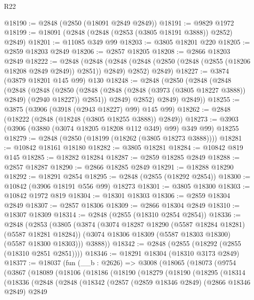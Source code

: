 \begin{lexlean}{R22}
\begin{coremodule}
@18190 := @2848 (@2850 (@18091 @2849 @2849))
@18191 := @9829 @1972
@18199 := @18091 (@2848 (@2848 (@2853 (@3805 @18191 @3888)) @2852) @2849)
@18201 := @11085 @349 @99
@18203 := @3805 @18201 @220
@18205 := @2859 @18203 @2849
@18206 := @2857 @18205
@18208 := @2866 @18203 @2849
@18222 := @2848
    (@2848
      (@2848 (@2848 (@2850 (@2848 (@2855 (@18206 @18208 @2849 @2849)) @2851)) @2849) @2852)
      @2849)
@18227 := @3874 (@3879 @18201 @145 @99) @130
@18248 := @2848
    (@2850
      (@2848
        (@2848
          (@2848
            (@2848
              (@2850
                (@2848 (@2848 (@2848 (@3973 (@3805 @18227 @3888)) @2849) (@2940 @18227)) @2851))
              @2849)
            @2852)
          @2849)
        @2849))
@18255 := @3875 (@3906 (@3918 (@2943 @18227) @99) @145 @99)
@18262 := @2848 (@18222 (@2848 (@18248 (@3805 @18255 @3888)) @2849))
@18273 := @3903 (@3906 (@3880 (@3074 @18205 @18208 @112 @349) @99) @349 @99) @18255
@18279 := @2848 (@2850 (@18199 (@18262 (@3805 @18273 @3888))))
@18281 := @10842 @18161 @18180
@18282 := @3805 @18281
@18284 := @10842 @819 @145
@18285 := @18282 @18284
@18287 := @2859 @18285 @2849
@18288 := @2857 @18287
@18290 := @2866 @18285 @2849
@18291 := @18288 @18290
@18292 := @18291 @2854
@18295 := @2848 (@2855 (@18292 @2854))
@18300 := @10842 (@3906 @18191 @556 @99) @18273
@18301 := @3805 @18300
@18303 := @10842 @1972 @819
@18304 := @18301 @18303
@18306 := @2859 @18304 @2849
@18307 := @2857 @18306
@18309 := @2866 @18304 @2849
@18310 := @18307 @18309
@18314 := @2848 (@2855 (@18310 @2854 @2854))
@18336 := @2848
    (@2853
      (@3805
        (@3874
          (@3074 @18287 @18290 (@5587 @18284 @18281) (@5587 @18281 @18284))
          (@3074 @18306 @18309 (@5587 @18303 @18300) (@5587 @18300 @18303)))
        @3888))
@18342 := @2848 (@2855 (@18292 (@2855 (@18310 @2851 @2851))))
@18346 := @18291 @18304 (@18310 @3173 @2849)
@18377 := @18037
    (fun (__b : @2626) =>
    @3008
      (@18065
        (@18073
          (@9754
            (@3867
              (@18089
                (@18106
                  (@18186
                    (@18190
                      (@18279
                        (@18190
                          (@18295
                            (@18314
                              (@18336
                                (@2848
                                  (@2848
                                    (@18342
                                      (@2857
                                        (@2859 @18346 @2849)
                                        (@2866 @18346 @2849)
                                        @2849

\end{coremodule}
\end{lexlean}
